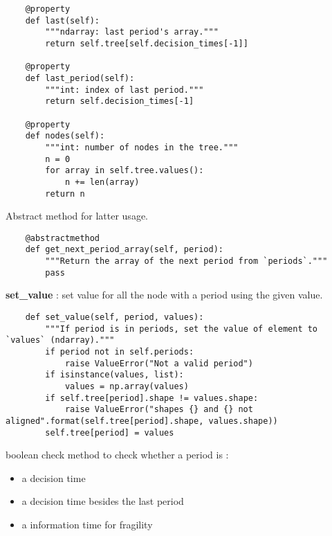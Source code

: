 \documentclass[12pt]{article}
\begin{document}
\begin{verbatim}
	@property
	def last(self):
		"""ndarray: last period's array."""
		return self.tree[self.decision_times[-1]]

	@property
	def last_period(self):
		"""int: index of last period."""
		return self.decision_times[-1]

	@property
	def nodes(self):
		"""int: number of nodes in the tree."""
		n = 0
		for array in self.tree.values():
			n += len(array)
		return n
\end{verbatim}
Abstract method for latter usage.
\begin{verbatim}
	@abstractmethod
	def get_next_period_array(self, period):
		"""Return the array of the next period from `periods`."""
		pass
\end{verbatim}
\textbf{set\_value} : set value for all the node with a period using the given value.
\begin{verbatim}
	def set_value(self, period, values):
		"""If period is in periods, set the value of element to `values` (ndarray)."""
		if period not in self.periods:
			raise ValueError("Not a valid period")
		if isinstance(values, list):
			values = np.array(values)
		if self.tree[period].shape != values.shape:
			raise ValueError("shapes {} and {} not aligned".format(self.tree[period].shape, values.shape))
		self.tree[period] = values
\end{verbatim}
boolean check method to check whether a period is :
\begin{itemize}
  \item a decision time
  \item a decision time besides the last period
  \item a information time for fragility
\end{itemize}
\end{document}
